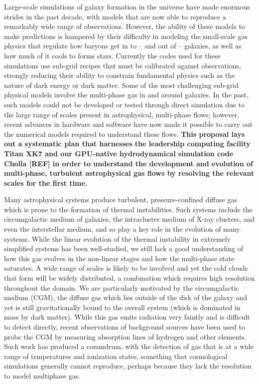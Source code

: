 \documentclass[11pt,letterpaper,english]{article}
\begin{document}
Large-scale simulations of galaxy formation in the universe have made enormous strides in the past decade, with models that are now able to reproduce a remarkably wide range of observations.  However, the ability of these models to make predictions is hampered by their difficulty in modeling the small-scale gas physics that regulate how baryons get in to -- and out of -- galaxies, as well as how much of it cools to forms stars.   Currently the codes used for these simulations use sub-grid recipes that must be calibrated against observations, strongly reducing their ability to constrain fundamental physics such as the nature of dark energy or dark matter.  Some of the most challenging sub-grid physical models involve the multi-phase gas in and around galaxies.   In the past, such models could not be developed or tested through direct simulation due to the large range of scales present in astrophysical, multi-phase flows; however, recent advances in hardware and software have now made it possible to carry out the numerical models required to understand these flows. {\bf This proposal lays out a systematic plan that harnesses the leadership computing facility Titan XK7 and our GPU-native hydrodynamical simulation code Cholla [REF] in order to understand the development and evolution of multi-phase, turbulent astrophysical gas flows by resolving the relevant scales for the first time. }

Many astrophysical systems produce turbulent, pressure-confined diffuse gas which is prone to the formation of thermal instabilities.  Such systems include the circumgalactic medium of galaxies, the intracluster medium of X-ray clusters, and even the interstellar medium, and so play a key role in the evolution of many systems.  While the linear evolution of the thermal instability in extremely simplified systems has been well-studied, we still lack a good understanding of how this gas evolves in the non-linear stages and how the multi-phase state saturates.  A wide range of scales is likely to be involved and yet the cold clouds that form will be widely distributed, a combination which requires high resolution throughout the domain.  We are particularly motivated by the circumgalactic medium (CGM), the diffuse gas which lies outside of the disk of the galaxy and yet is still gravitationally bound to the overall system (which is dominated in mass by dark matter).  While this gas emits radiation very faintly and is difficult to detect directly, recent observations of background sources have been used to probe the CGM by measuring absorption lines of hydrogen and other elements.  Such work has produced a conundrum, with the detection of gas that is at a wide range of temperatures and ionization states, something that cosmological simulations generally cannot reproduce, perhaps because they lack the resolution to model multiphase gas.
\end{document}

